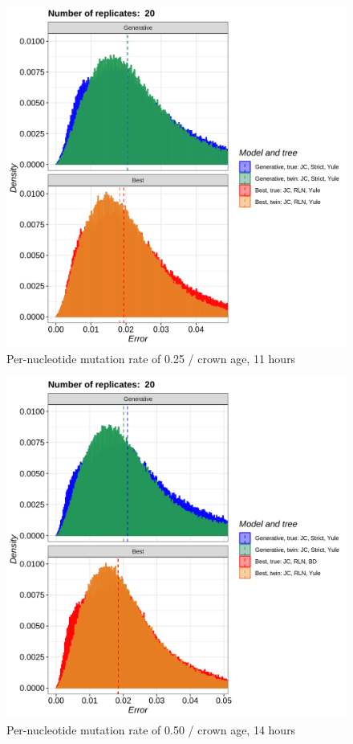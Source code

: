 \begin{figure}[H]
  \includegraphics[width=\textwidth]{pirouette_example_35/errors.png}
  \caption{Per-nucleotide mutation rate of 0.25 / crown age, 11 hours}
\end{figure}

\begin{figure}[H]
  \includegraphics[width=\textwidth]{pirouette_example_36/errors.png}
  \caption{Per-nucleotide mutation rate of 0.50 / crown age, 14 hours}
\end{figure}

